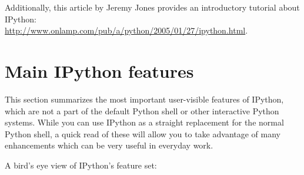 Additionally, this article by Jeremy Jones provides an introductory
tutorial about IPython:\\
\url{http://www.onlamp.com/pub/a/python/2005/01/27/ipython.html}.


\section[Main features]{Main IPython features}

This section summarizes the most important user-visible features of
IPython, which are not a part of the default Python shell or other
interactive Python systems. While you can use IPython as a straight
replacement for the normal Python shell, a quick read of these will
allow you to take advantage of many enhancements which can be very
useful in everyday work.

A bird's eye view of IPython's feature set:

